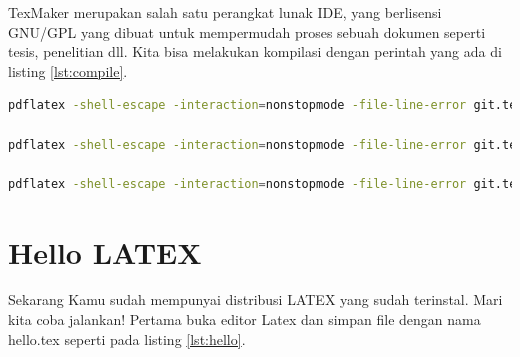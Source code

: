 TexMaker merupakan salah satu perangkat lunak IDE, yang berlisensi GNU/GPL yang dibuat untuk mempermudah proses sebuah dokumen seperti tesis, penelitian dll. Kita bisa melakukan kompilasi dengan perintah yang ada di listing \ref{lst:compile}.

\begin{lstlisting}[caption=Perintah kompilasi latex keluaran pdf,label={lst:compile},language=sh]
pdflatex -shell-escape -interaction=nonstopmode -file-line-error git.tex | grep ".*:[0-9]*:.*|LaTeX Warning:"

pdflatex -shell-escape -interaction=nonstopmode -file-line-error git.tex | grep ".*:[0-9]*:.*"

pdflatex -shell-escape -interaction=nonstopmode -file-line-error git.tex | grep -i ".*:[0-9]*:.*\|warning"
\end{lstlisting} 

\section{Hello LATEX}
Sekarang Kamu sudah mempunyai distribusi LATEX yang sudah terinstal. Mari kita coba jalankan! Pertama buka editor Latex dan simpan file dengan nama hello.tex seperti pada listing \ref{lst:hello}.
\cite{kline2018latex}

